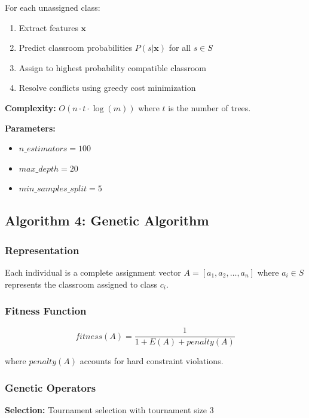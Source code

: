 \documentclass[algorithms,article,submit,pdftex,moreauthors]{Definitions/mdpi}
\begin{document}
For each unassigned class:
\begin{enumerate}
\item Extract features $\mathbf{x}$
\item Predict classroom probabilities $P(s|\mathbf{x})$ for all $s \in S$
\item Assign to highest probability compatible classroom
\item Resolve conflicts using greedy cost minimization
\end{enumerate}

\textbf{Complexity:} $O(n \cdot t \cdot \log(m))$ where $t$ is the number of trees.

\textbf{Parameters:}
\begin{itemize}
\item $n\_estimators = 100$
\item $max\_depth = 20$
\item $min\_samples\_split = 5$
\end{itemize}

\subsection{Algorithm 4: Genetic Algorithm}

\subsubsection{Representation}

Each individual is a complete assignment vector $A = [a_1, a_2, \ldots, a_n]$ where $a_i \in S$ represents the classroom assigned to class $c_i$.

\subsubsection{Fitness Function}

\begin{equation}
fitness(A) = \frac{1}{1 + E(A) + penalty(A)}
\end{equation}

where $penalty(A)$ accounts for hard constraint violations.

\subsubsection{Genetic Operators}

\textbf{Selection:} Tournament selection with tournament size 3
\end{document}
